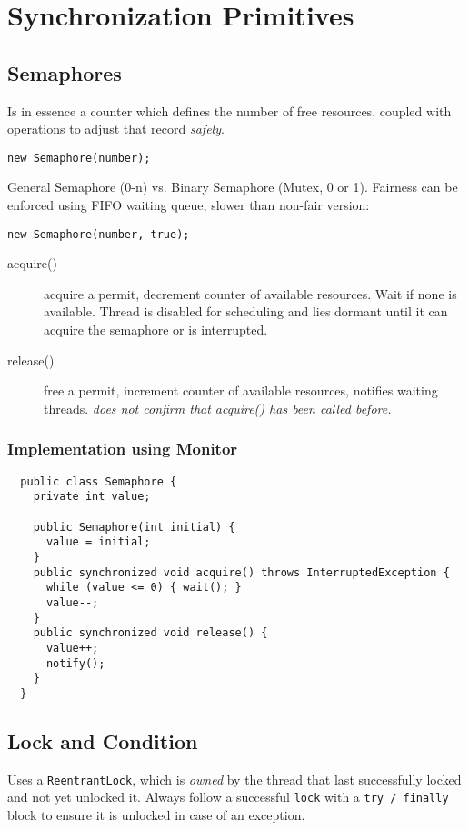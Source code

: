 \section{Synchronization Primitives}

\subsection{Semaphores}

Is in essence a counter which defines the number of free resources, coupled with operations to adjust that record \emph{safely}.

\texttt{new Semaphore(number);}

General Semaphore (0-n) vs. Binary Semaphore (Mutex, 0 or 1). Fairness can be enforced using FIFO waiting queue, slower than non-fair version:

\texttt{new Semaphore(number, true);}

\begin{description}
  \item[acquire()] acquire a permit, decrement counter of available resources. Wait if none is available. Thread is disabled for scheduling and lies dormant until it can acquire the semaphore or is interrupted.
  \item[release()] free a permit, increment counter of available resources, notifies waiting threads. \textit{does not confirm that acquire() has been called before.}
\end{description}

\subsubsection*{Implementation using Monitor}
\begin{verbatim}
  public class Semaphore {
    private int value;

    public Semaphore(int initial) {
      value = initial;
    }
    public synchronized void acquire() throws InterruptedException {
      while (value <= 0) { wait(); }
      value--;
    }
    public synchronized void release() {
      value++;
      notify();
    }
  }
\end{verbatim}

\subsection{Lock and Condition}

Uses a \texttt{ReentrantLock}, which is \textit{owned} by the thread that last successfully locked and not yet unlocked it. Always follow a successful \texttt{lock} with a \texttt{try / finally} block to ensure it is unlocked in case of an exception.

